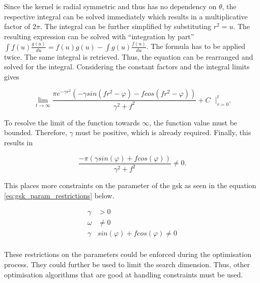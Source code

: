 \documentclass[./\jobname.tex]{subfiles}
\begin{document}
Since the kernel is radial symmetric and thus has no dependency on $\theta$, the respective integral can be solved immediately which results in a multiplicative factor of $2 \pi$. The integral can be further simplified by substituting $r^2 = u$.
The resulting expression can be solved with ``integration by part'' $\int f(u) \frac{g(u)}{du} = f(u) g(u) - \int g(u) \frac{f(u)}{du}$. The formula has to be applied twice. The same integral is retrieved. Thus, the equation can be rearranged and solved for the integral. Considering the constant factors and the integral limits gives 

\begin{equation}
\lim_{t \to \infty} \frac{\pi e^{-\gamma r^2}(- \gamma sin(f r^2 - \varphi) - f cos(f r^2 - \varphi))}{ \gamma^2 + f^2} + C \text{ } \Bigg|_{r=0}^{t}.
\end{equation}

To resolve the limit of the function towards $\infty$, the function value must be bounded. Therefore, $\gamma$ must be positive, which is already required. Finally, this results in 

\begin{equation}
	\frac{-\pi (\gamma sin(\varphi) + f cos(\varphi))}{\gamma^2 + f^2} \neq 0.
\end{equation}

This places more constraints on the parameter of the \gls{gsk} as seen in the equation \eqref{eq:gsk_param_restrictions} below. 

\begin{equation}
\label{eq:gsk_param_restrictions}
	\begin{split}
	\gamma & > 0 \\
	\omega & \neq 0 \\
	\gamma & sin(\varphi) + f cos(\varphi) \neq 0 \\
	\end{split}
\end{equation}

These restrictions on the parameters could be enforced during the optimisation process. They could further be used to limit the search dimension. Thus, other optimisation algorithms that are good at handling constraints must be used. 
\end{document}
